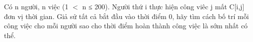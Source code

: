 Có n người, n việc (1 $<$ n ≤ 200). Người thứ i thực hiện công viêc j mất C[i,j] đơn vị thời gian. Giả sử tất cả bắt đầu vào thời điểm 0, hãy tìm cách bố trí mỗi công việc cho mỗi người sao cho thời điểm hoàn thành công việc là sớm nhất có thể.